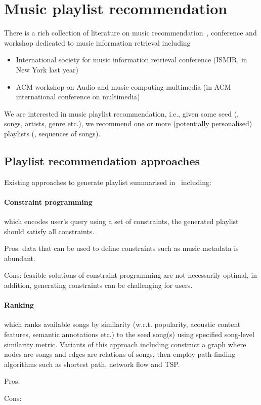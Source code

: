 \section{Music playlist recommendation}
\label{sec:playlist}

There is a rich collection of literature on music recommendation~\cite{recsysbook2015}, 
conference and workshop dedicated to music information retrieval including
\begin{itemize}
\item International society for music information retrieval conference (ISMIR, in New York last year)
\item ACM workshop on Audio and music computing multimedia (in ACM international conference on multimedia)
\end{itemize}

We are interested in music playlist recommendation, 
i.e., given some seed (\eg, songs, artists, genre etc.), 
we recommend one or more (potentially personalised) playlists (\ie, sequences of songs).


\subsection{Playlist recommendation approaches}

Existing approaches to generate playlist summarised in~\cite{recsysbook2015} including:

\paragraph{Constraint programming} which encodes user's query using a set of constraints, 
the generated playlist should satisfy all constraints.
\begin{description}
\item Pros: data that can be used to define constraints such as music metadata is abundant.
\item Cons: feasible solutions of constraint programming are not necessarily optimal, in addition, 
            generating constraints can be challenging for users.
\end{description}

\paragraph{Ranking} which ranks available songs by similarity (w.r.t. popularity, acoustic content features, semantic annotations etc.) 
to the seed song(s) using specified song-level similarity metric.
Variants of this approach including construct a graph where nodes are songs and edges are relations of songs,
then employ path-finding algorithms such as shortest path, network flow and TSP.
\begin{description}
\item Pros: 
\item Cons: 
\end{description}


